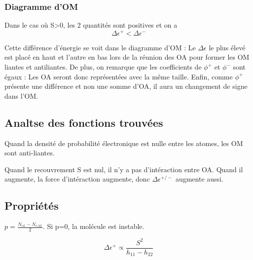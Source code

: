 \documentclass[french]{yLectureNote}
\begin{document}
\subsubsection{Diagramme d'OM}
Dans le cas où S>0, les 2 quantités sont positives et on a \[\Delta\epsilon^+< \Delta \epsilon^-\]

Cette différence d'énergie se voit dans le diagramme d'OM : Le \(\Delta \epsilon\) le plus élevé est placé en haut et l'autre en bas lors de la réunion des OA pour former les OM liantes et antiliantes. De plus, on remarque que les coefficients de \(\phi^+\) et \(\phi^-\) sont égaux : Les OA seront donc représentées avec la m\^eme taille. Enfin, comme \(\phi^+\) présente une différence et non une somme d'OA, il aura un changement de signe dans l'OM.
\subsection{Analtse des fonctions trouvées}
Quand la densité de probabilité électronique est nulle entre les atomes, les OM sont anti-liantes.

Quand le recouvrement S est nul, il n'y a pas d'intéraction entre OA. Quand il augmente, la force d'intéraction augmente, donc \(\Delta \epsilon^{+/-}\) augmente aussi.
\subsection{Propriétés}
\begin{theorem}
$p = \frac{N_{eL}-N_{eAL}}{2}$. Si p=0, la molécule est instable.
\end{theorem}
\begin{theorem}
 \[\Delta \epsilon^+ \propto \frac{S^2}{h_{11}-h_{22}}\]
\end{theorem}
\end{document}
